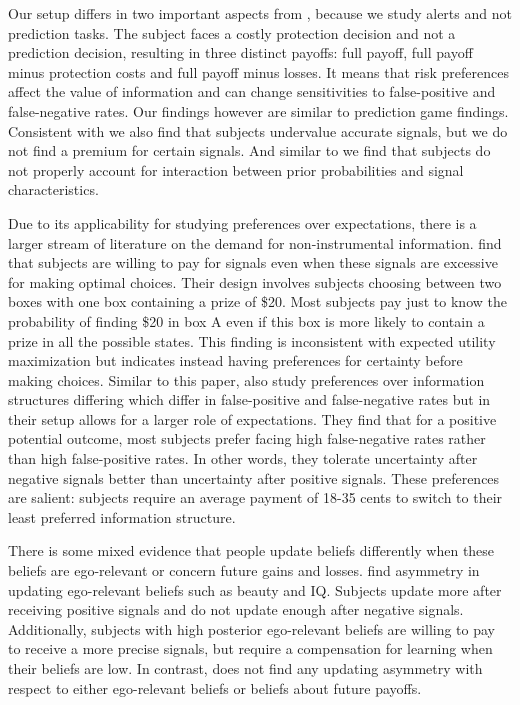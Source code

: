 \documentclass[12pt,a4paper]{article}
\begin{document}
Our setup differs in two important aspects from \citep*{ambuehl_belief_2018, xu_revealed_2020}, because we study alerts and not prediction tasks. The subject faces a costly protection decision and not a prediction decision, resulting in three distinct payoffs: full payoff, full payoff minus protection costs and full payoff minus losses. It means that risk preferences affect the value of information and can change sensitivities to false-positive and false-negative rates. Our findings however are similar to prediction game findings. Consistent with \citet{ambuehl_belief_2018} we also find that subjects undervalue accurate signals, but we do not find a premium for certain signals.  And similar to \citet{xu_revealed_2020} we find that subjects do not properly account for interaction between prior probabilities and signal characteristics.

Due to its applicability for studying preferences over expectations, there is a larger stream of literature on the demand for non-instrumental information. \citet{eliaz_paying_2010} find that subjects are willing to pay for signals even when these signals are excessive for making optimal choices. Their design involves subjects choosing between two boxes with one box containing a prize of \$20. Most subjects pay just to know the probability of finding \$20 in box A even if this box is more likely to contain a prize in all the possible states. This finding is inconsistent with expected utility maximization but indicates instead having preferences for certainty before making choices.  Similar to this paper, \citet{masatlioglu_intrinsic_2017} also study preferences over information structures differing which differ in false-positive and false-negative rates but in their setup allows for a larger role of expectations. They find that for a positive potential outcome, most subjects prefer facing high false-negative rates rather than high false-positive rates. In other words, they tolerate uncertainty after negative signals better than uncertainty after positive signals. These preferences are salient: subjects require an average payment of 18-35 cents to switch to their least preferred information structure.

There is some mixed evidence that people update beliefs differently when these beliefs are ego-relevant or concern future gains and losses. \citet{eil_good_2011} find asymmetry in updating ego-relevant beliefs such as beauty and IQ. Subjects update more after receiving positive signals and do not update enough after negative signals. Additionally, subjects with high posterior ego-relevant beliefs are willing to pay to receive a more precise signals, but require a compensation for learning when their beliefs are low. In contrast, \citet{coutts_good_2019} does not find any updating asymmetry with respect to either ego-relevant beliefs or beliefs about future payoffs. 
\end{document}
